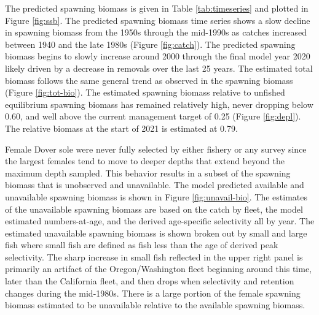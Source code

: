 \documentclass[11pt,
  english,
  a4paper,
]{article}
\begin{document}
\leavevmode\tagmcend\tagstructend


The predicted spawning biomass is given in Table \ref{tab:timeseries} and plotted in Figure \ref{fig:ssb}. The predicted spawning biomass time series shows a slow decline in spawning biomass from the 1950s through the mid-1990s as catches increased between 1940 and the late 1980s (Figure \ref{fig:catch}). The predicted spawning biomass begins to slowly increase around 2000 through the final model year 2020 likely driven by a decrease in removals over the last 25 years. The estimated total biomass follows the same general trend as observed in the spawning biomass (Figure \ref{fig:tot-bio}). The estimated spawning biomass relative to unfished equilibrium spawning biomass has remained relatively high, never dropping below 0.60, and well above the current management target of 0.25 (Figure \ref{fig:depl}). The relative biomass at the start of 2021 is estimated at 0.79.

\leavevmode\tagmcend\tagstructend\par


Female Dover sole were never fully selected by either fishery or any survey since the largest females tend to move to deeper depths that extend beyond the maximum depth sampled. This behavior results in a subset of the spawning biomass that is unobserved and unavailable. The model predicted available and unavailable spawning biomass is shown in Figure \ref{fig:unavail-bio}. The estimates of the unavailable spawning biomass are based on the catch by fleet, the model estimated numbers-at-age, and the derived age-specific selectivity all by year. The estimated unavailable spawning biomass is shown broken out by small and large fish where small fish are defined as fish less than the age of derived peak selectivity. The sharp increase in small fish reflected in the upper right panel is primarily an artifact of the Oregon/Washington fleet beginning around this time, later than the California fleet, and then drops when selectivity and retention changes during the mid-1980s. There is a large portion of the female spawning biomass estimated to be unavailable relative to the available spawning biomass.

\leavevmode\tagmcend\tagstructend\par

\end{document}
